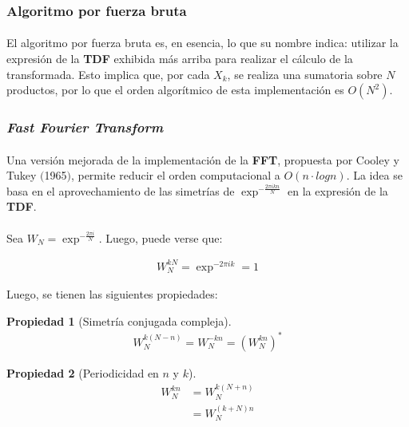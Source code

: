 \documentclass[12pt, twocolumn]{article}
\newtheorem{theorem}{Propiedad}
\begin{document}
	\subsubsection{Algoritmo por fuerza bruta}
	
	\paragraph{} El algoritmo por fuerza bruta es, en esencia, lo que su nombre indica: utilizar la expresión de la \textbf{TDF} exhibida más arriba para realizar el cálculo de la transformada. Esto implica que, por cada $X_{k}$, se realiza una sumatoria sobre $N$ productos, por lo que el orden algorítmico de esta implementación es $O(N^{2})$.
	
	\subsubsection{\textit{Fast Fourier Transform}}
	
	\paragraph{} Una versión mejorada de la implementación de la \textbf{FFT}, propuesta por Cooley y Tukey $($1965$)$, permite reducir el orden computacional a $O(n\cdot log n)$. La idea se basa en el aprovechamiento de las simetrías de $\exp^{-\frac{2\pi i k n}{N}}$ en la expresión de la \textbf{TDF}.
	
	\paragraph{} Sea $W_{N} = \exp^{-\frac{2\pi i}{N}}$. Luego, puede verse que:
	
	\begin{align}
		W_{N}^{kN} = \exp^{-2\pi i k} = 1
	\end{align}
	
	Luego, se tienen las siguientes propiedades:
	
	\begin{theorem}[Simetría conjugada compleja]
		\begin{align*}
			W_{N}^{k(N-n)} = W_{N}^{-kn} = (W_{N}^{kn})^{*}
		\end{align*}
	\end{theorem}
	
	\begin{theorem}[Periodicidad en $n$ y $k$]
		\begin{align*}
			W_{N}^{kn} &= W_{N}^{k(N+n)} \\
			&= W_{N}^{(k+N)n}
		\end{align*}
	\end{theorem}
	
\end{document}
